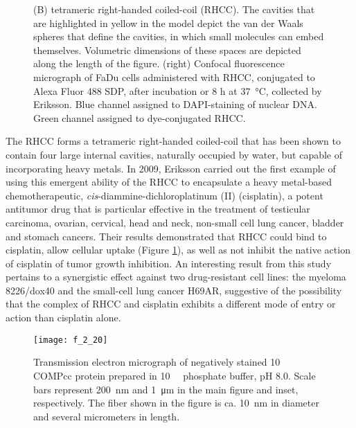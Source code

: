 \begin{refsection}
\begin{figure}[h!]
{        (B) tetrameric right-handed coiled-coil (RHCC). The cavities that are
        highlighted in yellow in the model depict the van der Waals spheres that
        define the cavities, in which small molecules can embed themselves.
        Volumetric dimensions of these spaces are depicted along the length of
        the figure.\cite{McFarlane2009}
        (right) Confocal fluorescence micrograph of FaDu cells administered with
        RHCC, conjugated to Alexa Fluor 488 SDP, after incubation or 8 h at
        \SI{37}{\celsius}, collected by Eriksson. Blue channel assigned to
        DAPI-staining of nuclear DNA. Green channel assigned to dye-conjugated
        RHCC.\cite{Eriksson2009}}\label{fig:coiled-coil_binding}
\end{figure}
The RHCC forms a tetrameric right-handed coiled-coil that has been shown to
contain four large internal cavities, naturally occupied by water, but capable
of incorporating heavy metals. In 2009, Eriksson  carried out the
first example of using this emergent ability of the RHCC to encapsulate a
heavy metal-based chemotherapeutic, \emph{cis}-diammine-dichloroplatinum (II)
(cisplatin), a potent antitumor drug that is particular effective in the
treatment of testicular carcinoma, ovarian, cervical, head and neck, 
non-small cell lung cancer, bladder and stomach cancers.\cite{Go1999} Their
results demonstrated that RHCC could bind to cisplatin, allow cellular uptake
(Figure \ref{fig:coiled-coil_binding}), as well as not inhibit
the native action of cisplatin of tumor growth inhibition. An interesting result
from this study pertains to a synergistic effect against two drug-resistant cell
lines: the myeloma 8226/dox40 and the small-cell lung cancer H69AR, suggestive
of the possibility that the complex of RHCC and cisplatin exhibits a different
mode of entry or action than cisplatin alone.

\begin{figure}[h!] \centering \texttt{[image: f\_2\_20]}
    \caption[Transmission electron micrograph of negatively stained
    \SI{10}{\micro\moLar} COMPcc protein prepared in
\SI{10}{\milli\moLar} phosphate buffer, pH 8.0. Scale bars represent
\SI{200}{\nm} and \SI{1}{\um} in the main figure and inset, respectively. The
fiber shown in the figure is ca. \SI{10}{\nm} in diameter and several
micrometers in length.]{Transmission electron micrograph of negatively stained
    \SI{10}{\micro\moLar} COMPcc protein prepared in
\SI{10}{\milli\moLar} phosphate buffer, pH 8.0. Scale bars represent
\SI{200}{\nm} and \SI{1}{\um} in the main figure and inset, respectively. The
fiber shown in the figure is ca. \SI{10}{\nm} in diameter and several
micrometers in length.\cite{Gunasekar2012}}\label{fig:COMP_EM_2} \end{figure}


\end{refsection}
